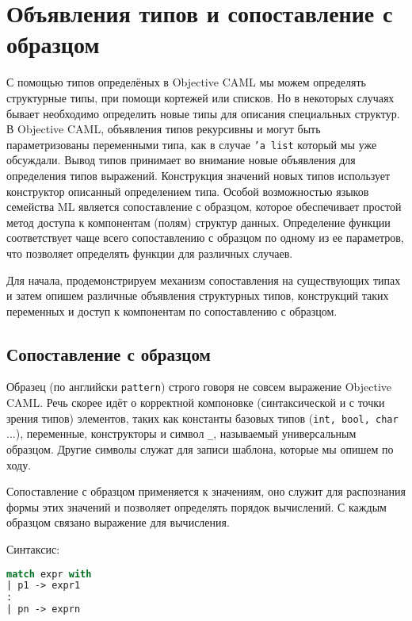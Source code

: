\section{Объявления типов и сопоставление с образцом}
\label{sec:types_and_pattern_matching}

С помощью типов определёных в Objective CAML мы можем определять структурные
типы, при помощи кортежей или списков. Но в некоторых случаях бывает необходимо
определить новые типы для описания специальных структур. В Objective CAML,
объявления типов рекурсивны и могут быть параметризованы переменными типа, как в
случае \texttt{'a list} который мы уже обсуждали. Вывод типов принимает во
внимание новые объявления для определения типов выражений. Конструкция значений
новых типов использует конструктор описанный определением типа. Особой
возможностью языков семейства ML является сопоставление с образцом, которое
обеспечивает простой метод доступа к компонентам (полям) структур данных.
Определение функции соответствует чаще всего сопоставлению с образцом по одному
из ее параметров, что позволяет определять функции для различных случаев.

Для начала, продемонстрируем механизм сопоставления на существующих типах и
затем опишем различные объявления структурных типов, конструкций таких
переменных и доступ к компонентам по сопоставлению с образцом.

\subsection{Сопоставление с образцом}

 Образец (по английски \texttt{pattern}) строго говоря не совсем выражение
Objective CAML. Речь скорее идёт о корректной компоновке (синтаксической и с
точки зрения типов) элементов, таких как константы базовых типов (\texttt{int,
bool, char $\ldots$}), переменные, конструкторы и символ \texttt{\_}, называемый
универсальным образцом. Другие символы служат для записи шаблона, которые мы
опишем по ходу.

Сопоставление с образцом применяется к значениям, оно служит для распознания
формы этих значений и позволяет определять порядок вычислений. С каждым образцом
связано выражение для вычисления.

Синтаксис:

\begin{lstlisting}[language=OCaml]
match expr with
| p1 -> expr1
:
| pn -> exprn
\end{lstlisting}


